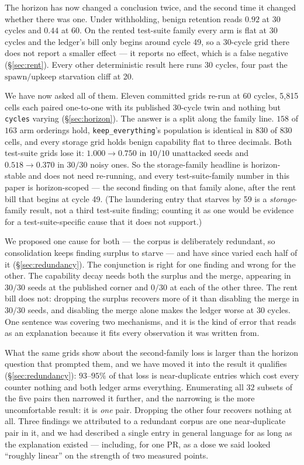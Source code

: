 The horizon has now changed a conclusion twice, and the second time it
changed whether there was one. Under withholding, benign retention reads
$0.92$ at 30 cycles and $0.44$ at 60. On the rented test-suite family
every arm is flat at 30 cycles and the ledger's bill only begins around
cycle 49, so a 30-cycle grid there does not report a smaller effect --- it
reports no effect, which is a false negative (\S\ref{sec:rent}). Every
other deterministic result here runs 30 cycles, four past the
$\text{spawn}/\text{upkeep}$ starvation cliff at 20.

We have now asked all of them. Eleven committed grids re-run at 60
cycles, 5,815 cells each paired one-to-one with its published
30-cycle twin and nothing but \texttt{cycles} varying
(\S\ref{sec:horizon}). The answer is a split along the family line.
$158$ of $163$ arm orderings hold, \texttt{keep\_everything}'s
population is identical in $830$ of $830$ cells, and every storage grid
holds benign capability flat to three decimals. Both test-suite grids
lose it: $1.000 \rightarrow 0.750$ in $10/10$ unattacked seeds and
$0.518 \rightarrow 0.370$ in $30/30$ noisy ones. So the storage-family
headline is horizon-stable and does not need re-running, and every
test-suite-family number in this paper is horizon-scoped --- the second
finding on that family alone, after the rent bill that begins at cycle
49. (The laundering entry that starves by 59 is a \emph{storage}-family
result, not a third test-suite finding; counting it as one would be
evidence for a test-suite-specific cause that it does not support.)

We proposed one cause for both --- the corpus is deliberately redundant,
so consolidation keeps finding surplus to starve --- and have since
varied each half of it (\S\ref{sec:redundancy}). The conjunction is
right for one finding and wrong for the other. The capability decay
needs both the surplus and the merge, appearing in $30/30$ seeds at the
published corner and $0/30$ at each of the other three. The rent bill
does not: dropping the surplus recovers more of it than disabling the
merge in $30/30$ seeds, and disabling the merge alone makes the ledger
worse at 30 cycles. One sentence was covering two mechanisms, and it is
the kind of error that reads as an explanation because it fits every
observation it was written from.

What the same grids show about the second-family loss is larger than the
horizon question that prompted them, and we have moved it into the
result it qualifies (\S\ref{sec:redundancy}): $93$--$95\%$ of that
loss is near-duplicate entries which cost every counter nothing and both
ledger arms everything. Enumerating all $32$ subsets of the five pairs
then narrowed it further, and the narrowing is the more uncomfortable
result: it is \emph{one} pair. Dropping the other four recovers nothing
at all. Three findings we attributed to a redundant corpus are one
near-duplicate pair in it, and we had described a single entry in
general language for as long as the explanation existed --- including,
for one PR, as a dose we said looked ``roughly linear'' on the strength
of two measured points.

